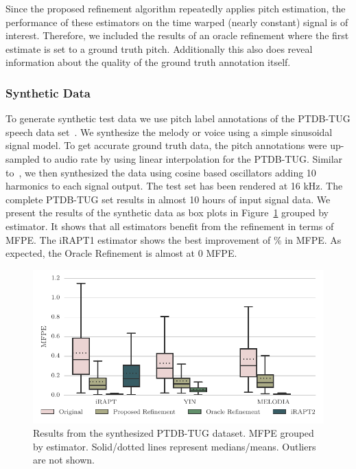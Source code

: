Since the proposed refinement algorithm repeatedly applies pitch estimation, the performance of these estimators on the time warped (nearly constant) signal is of interest. Therefore, we included the results of an oracle refinement where the first estimate is set to a ground truth pitch. Additionally this also does reveal information about the quality of the ground truth annotation itself.

\subsubsection{Synthetic Data} %
\label{ssub:sythetic_data}

To generate synthetic test data we use pitch label annotations of the PTDB-TUG speech data set~\cite{pirker11}. We synthesize the melody or voice using a simple sinusoidal signal model. To get accurate ground truth data, the pitch annotations were up-sampled to audio rate by using linear interpolation for the PTDB-TUG. Similar to~\cite{mauch14}, we then synthesized the data using cosine based oscillators adding 10 harmonics to each signal output.
The test set has been rendered at 16 kHz. The complete PTDB-TUG set results in almost 10 hours of input signal data.
We present the results of the synthetic data as box plots in Figure~\ref{fig:ptdbtug_synth} grouped by estimator. It shows that all estimators benefit from the refinement in terms of MFPE. The iRAPT1 estimator shows the best improvement of \ptdbtugsynthiRAPTIMPROMFPE \% in MFPE. As expected, the Oracle Refinement is almost at 0 MFPE.

\begin{figure}[t!]
\centering
		\includegraphics[width=0.90\columnwidth]{Chapters/05_Separation_Known/figures/stats_boxplot_ptdb_synth.pdf}
\caption{Results from the synthesized PTDB-TUG dataset. MFPE grouped by estimator. Solid/dotted lines represent medians/means. Outliers are not shown.}
\label{fig:ptdbtug_synth}
\end{figure}

